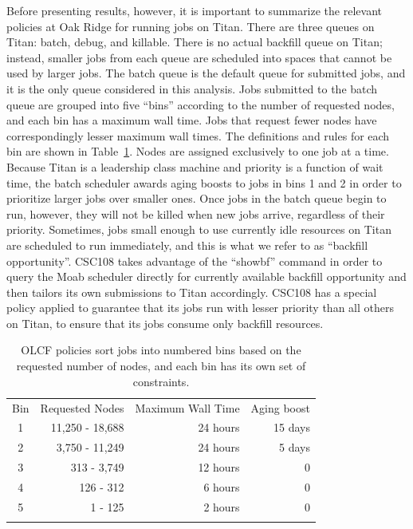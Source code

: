 Before presenting results, however, it is important to summarize the relevant
policies at Oak Ridge for running jobs on Titan. There are three queues on
Titan: batch, debug, and killable. There is no actual backfill queue on Titan;
instead, smaller jobs from each queue are scheduled into spaces that cannot be
used by larger jobs. The batch queue is the default queue for submitted jobs,
and it is the only queue considered in this analysis. Jobs submitted to the
batch queue are grouped into five ``bins'' according to the number of requested
nodes, and each bin has a maximum wall time. Jobs that request fewer nodes have
correspondingly lesser maximum wall times. The definitions and rules for each
bin are shown in Table~\ref{tab:olcfbins}. Nodes are assigned exclusively to
one job at a
time. Because Titan is a leadership class machine and priority is a function of
wait time, the batch scheduler awards aging boosts to jobs in bins 1 and 2 in
order to prioritize larger jobs over smaller ones. Once jobs in the batch queue
begin to run, however, they will not be killed when new jobs arrive, regardless
of their priority. Sometimes, jobs small enough to use currently idle resources
on Titan are scheduled to run immediately, and this is what we refer to as
``backfill opportunity''. CSC108 takes advantage of the ``showbf'' command in
order to query the Moab scheduler directly for currently available backfill
opportunity and then tailors its own submissions to Titan accordingly. CSC108
has a special policy applied to guarantee that its jobs run with lesser
priority than all others on Titan, to ensure that its jobs consume only
backfill resources.

\begin{table}
\caption{OLCF policies sort jobs into numbered bins based on the requested
number of nodes, and each bin has its own set of constraints.}
\label{tab:olcfbins}       %
\begin{tabular}{crrr}
\hline\noalign{\smallskip}
Bin & Requested Nodes   & Maximum Wall Time &   Aging boost \\
\noalign{\smallskip}\hline\noalign{\smallskip}
1   &   11,250 - 18,688 &   24 hours        &   15 days     \\
2   &    3,750 - 11,249 &   24 hours        &    5 days     \\
3   &       313 - 3,749 &   12 hours        &         0     \\
4   &         126 - 312 &    6 hours        &         0     \\
5   &           1 - 125 &    2 hours        &         0     \\
\noalign{\smallskip}\hline
\end{tabular}
\end{table}

